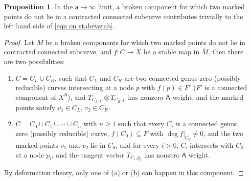 \documentclass[10pt]{amsart}
\theoremstyle{definition}
\newtheorem{Proposition}[Theorem]{Proposition}
\numberwithin{equation}{section}
\newcommand{\sA}{\mathsf{A}}
\begin{document}
\begin{Proposition}\label{prop on sym var van}
In the $\mathsf a\to \infty$ limit, a broken component for which two marked points do not lie in a contracted connected subcurve contributes trivially to the left hand side of \eqref{equ on stabevstab}.
\end{Proposition}

\begin{proof}
Let $\overline{M}$ be a broken components for which two marked points do not lie in contracted connected subcurve, and $f\colon C\to X$ be a stable map in $\overline{M}$, then
there are two possibilities:
\begin{enumerate}
\item[(a)] $C=C_L\cup C_R$, such that $C_L$ and $C_R$ are two connected genus zero (possibly reducible) curves intersecting at a node $p$ with $f(p)\in F'$ ($F'$ is a connected component of $X^\sA$), and $T_{C_L,p}\otimes T_{C_R,p}$ has nonzero $\sA$ weight, and the marked points satisfy $v_1\in C_L$, $v_2\in C_R$.
\item[(b)] $C=C_0\cup C_1\cup \cdots \cup C_n$ with $n\geqslant 1$ such that every $C_i$ is a connected genus zero (possibly reducible) curve, $f(C_0)\subseteq F$ with $\deg f|_{C_0}\neq 0$, and the two marked points $v_1$ and $v_2$ lie in $C_0$, and for every $i>0$, $C_i$ intersects with $C_0$ at a node $p_i$, and the tangent vector $T_{C_i,p_i}$ has nonzero $\sA$ weight.
\end{enumerate}
By deformation theory, only one of (a) or (b) can happen in this component. 




\end{proof}
\end{document}
